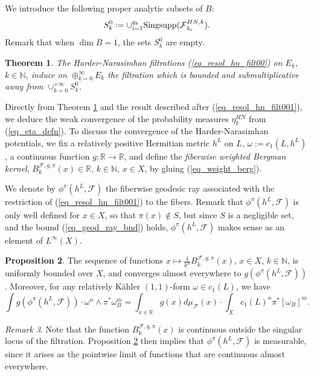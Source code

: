 \documentclass[12pt]{article}
\numberwithin{equation}{section}
\theoremstyle{theorem}
\newtheorem{thm}{Theorem}[section]
\theoremstyle{definition}
\newtheorem{prop}[thm]{Proposition}
\theoremstyle{remark}
\newtheorem{rem}[thm]{Remark}
\newcommand{\real}{\mathbb{R}}
\newcommand{\nat}{\mathbb{N}}
\begin{document}
	We introduce the following proper analytic subsets of $B$:
	\begin{equation}\label{eq_sk0_defn}
		S_k^0 := \cup_{i = 1}^{q_k} {\rm{Singsupp}}(\mathcal{F}^{HN, k}_{\lambda_i}).
	\end{equation}
	Remark that when $\dim B = 1$, the sets $S_k^0$ are empty.
	\begin{thm}\label{thm_HN_subm}
		The Harder-Narasimhan filtrations (\ref{eq_resol_hn_filt00}) on $E_k$, $k \in \nat$, induce on $\oplus_{k = 0}^{\infty} E_k$ the filtration which is bounded and submultiplicative away from $\cup_{k = 0}^{+ \infty} S_k^0$.
	\end{thm}
	\par 
	Directly from Theorem \ref{thm_HN_subm} and the result described after (\ref{eq_resol_hn_filt001}), we deduce the weak convergence of the probability measures $\eta_k^{HN}$ from (\ref{eq_eta_defn}).
	To discuss the convergence of the Harder-Narasimhan potentials, we fix a relatively positive Hermitian metric $h^L$ on $L$, $\omega := c_1(L, h^L)$, a continuous function $g : \real \to \real$, and define the \textit{fiberwise weighted Bergman kernel}, $B_k^{\mathcal{F}, g, \pi}(x) \in \real$, $k \in \mathbb{N}$, $x \in X$, by gluing (\ref{eq_weight_berg}).
	\par 
	We denote by $\phi^{\pi}(h^L, \mathcal{F})$ the fiberwise geodesic ray associated with the restriction of (\ref{eq_resol_hn_filt001}) to the fibers. 
	Remark that $\phi^{\pi}(h^L, \mathcal{F})$  is only well defined for $x \in X$, so that $\pi(x) \notin S$, but since $S$ is a negligible set, and the bound (\ref{eq_geod_ray_bnd}) holds, $\phi^{\pi}(h^L, \mathcal{F})$ makes sense as an element of $L^{\infty}(X)$. 
	\begin{prop}\label{prop_conv_berg_family}
		The sequence of functions $x \mapsto \frac{1}{k^n} B_k^{\mathcal{F}, g, \pi}(x)$, $x \in X$, $k \in \nat$, is uniformly bounded over $X$, and converges almost everywhere to $g(\phi^{\pi}(h^L, \mathcal{F}))$.
		Moreover, for any relatively Kähler $(1,1)$-form $\omega \in c_1(L)$, we have
		\begin{equation}\label{eq_hn_pt_func_gen}
			\int g(\phi^{\pi}(h^L, \mathcal{F})) \cdot \omega^n \wedge \pi^* \omega_B^m
			=
			\int_{x \in \real} g(x) d \mu_{\mathcal{F}}(x)
			\cdot
			\int_X c_1(L)^n \pi^* [\omega_B]^m.
		\end{equation}
	\end{prop}
	\begin{rem}\label{rem_conv_berg_family}
		Note that the function $B_k^{\mathcal{F}, g, \pi}(x)$ is continuous outside the singular locus of the filtration.
		Proposition \ref{prop_conv_berg_family} then implies that $\phi^{\pi}(h^L, \mathcal{F})$ is measurable, since it arises as the pointwise limit of functions that are continuous almost everywhere.
	\end{rem}
\end{document}

